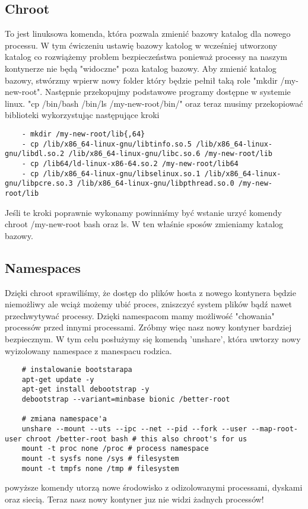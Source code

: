 \subsection{Chroot}
To jest linuksowa komenda, która pozwala zmienić bazowy katalog dla nowego processu. W tym ćwiczeniu ustawię bazowy katolog w wcześniej utworzony katalog co rozwiążemy problem bezpieczeństwa ponieważ processy na naszym kontynerze nie będą "widoczne" poza katalog bazowy. 
Aby zmienić katalog bazowy, stwórzmy wpierw nowy folder który będzie pełnił taką role "mkdir /my-new-root". Następnie przekopujmy podstawowe programy dostępne w systemie linux. "cp /bin/bash /bin/ls /my-new-root/bin/" oraz teraz musimy przekopiować biblioteki wykorzystując następujące kroki
\begin{lstlisting}
    - mkdir /my-new-root/lib{,64}
    - cp /lib/x86_64-linux-gnu/libtinfo.so.5 /lib/x86_64-linux-gnu/libdl.so.2 /lib/x86_64-linux-gnu/libc.so.6 /my-new-root/lib
    - cp /lib64/ld-linux-x86-64.so.2 /my-new-root/lib64
    - cp /lib/x86_64-linux-gnu/libselinux.so.1 /lib/x86_64-linux-gnu/libpcre.so.3 /lib/x86_64-linux-gnu/libpthread.so.0 /my-new-root/lib
\end{lstlisting}
Jeśli te kroki poprawnie wykonamy powinniśmy być wstanie urzyć komendy chroot /my-new-root bash oraz ls. W ten właśnie sposów zmieniamy katalog bazowy. 
\subsection{Namespaces}
Dzięki chroot sprawiliśmy, że dostęp do plików hosta z nowego kontynera będzie niemożliwy ale wciąż możemy ubić proces, zniszczyć system plików bądź nawet przechwytywać processy. 
Dzięki namespacom mamy możliwość "chowania" processów przed innymi processami. 
Zróbmy więc nasz nowy kontyner bardziej bezpiecznym. W tym celu posłużymy się komendą 'unshare', która uwtorzy nowy wyizolowany namespace z manespacu rodzica.

\begin{lstlisting}
    # instalowanie bootstarapa
    apt-get update -y
    apt-get install debootstrap -y
    debootstrap --variant=minbase bionic /better-root

    # zmiana namespace'a
    unshare --mount --uts --ipc --net --pid --fork --user --map-root-user chroot /better-root bash # this also chroot's for us
    mount -t proc none /proc # process namespace
    mount -t sysfs none /sys # filesystem
    mount -t tmpfs none /tmp # filesystem
\end{lstlisting}
powyższe komendy utorzą nowe środowisko z odizolowanymi processami, dyskami oraz siecią. Teraz nasz nowy kontyner juz nie widzi żadnych processów!
